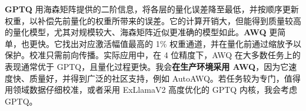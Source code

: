 \begin{interview}
\textbf{GPTQ} 用海森矩阵提供的二阶信息，将各层的量化误差降至最低，并按顺序更新权重，以补偿先前量化的权重所带来的误差。它的计算开销大，但能得到质量较高的量化模型，尤其对规模较大、海森矩阵近似更准确的模型如此。\textbf{AWQ} 更简单，也更快。它找出对应激活幅值最高的 1\% 权重通道，并在量化前通过缩放予以保护。校准只需前向传播。实际应用中，在 4 位精度下，AWQ 在大多数任务上的表现通常优于 GPTQ，且量化过程更快。我会\textbf{在生产环境采用 AWQ}，因为它速度快、质量好，并得到广泛的社区支持，例如 AutoAWQ。若任务较为专门，值得用领域数据仔细校准，或者采用 ExLlamaV2 高度优化的 GPTQ 内核，我会考虑 GPTQ。
\end{interview}

